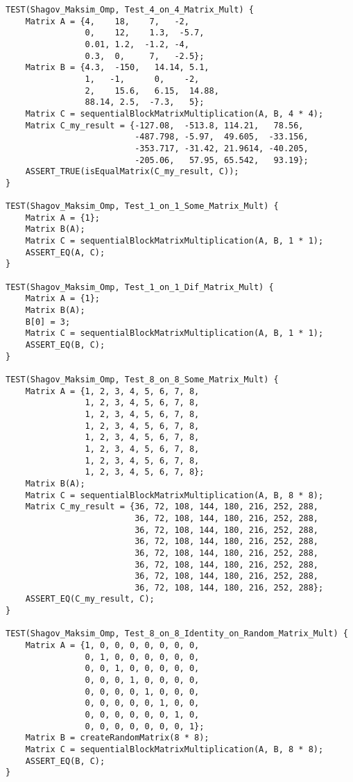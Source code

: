 \documentclass{report}
\begin{document}
\begin{lstlisting}
TEST(Shagov_Maksim_Omp, Test_4_on_4_Matrix_Mult) {
    Matrix A = {4,    18,    7,   -2,
                0,    12,    1.3,  -5.7,
                0.01, 1.2,  -1.2, -4,
                0.3,  0,     7,   -2.5};
    Matrix B = {4.3,  -150,   14.14, 5.1,
                1,   -1,      0,    -2,
                2,    15.6,   6.15,  14.88,
                88.14, 2.5,  -7.3,   5};
    Matrix C = sequentialBlockMatrixMultiplication(A, B, 4 * 4);
    Matrix C_my_result = {-127.08,  -513.8, 114.21,   78.56,
                          -487.798, -5.97,  49.605,  -33.156,
                          -353.717, -31.42, 21.9614, -40.205,
                          -205.06,   57.95, 65.542,   93.19};
    ASSERT_TRUE(isEqualMatrix(C_my_result, C));
}

TEST(Shagov_Maksim_Omp, Test_1_on_1_Some_Matrix_Mult) {
    Matrix A = {1};
    Matrix B(A);
    Matrix C = sequentialBlockMatrixMultiplication(A, B, 1 * 1);
    ASSERT_EQ(A, C);
}

TEST(Shagov_Maksim_Omp, Test_1_on_1_Dif_Matrix_Mult) {
    Matrix A = {1};
    Matrix B(A);
    B[0] = 3;
    Matrix C = sequentialBlockMatrixMultiplication(A, B, 1 * 1);
    ASSERT_EQ(B, C);
}

TEST(Shagov_Maksim_Omp, Test_8_on_8_Some_Matrix_Mult) {
    Matrix A = {1, 2, 3, 4, 5, 6, 7, 8,
                1, 2, 3, 4, 5, 6, 7, 8,
                1, 2, 3, 4, 5, 6, 7, 8,
                1, 2, 3, 4, 5, 6, 7, 8,
                1, 2, 3, 4, 5, 6, 7, 8,
                1, 2, 3, 4, 5, 6, 7, 8,
                1, 2, 3, 4, 5, 6, 7, 8,
                1, 2, 3, 4, 5, 6, 7, 8};
    Matrix B(A);
    Matrix C = sequentialBlockMatrixMultiplication(A, B, 8 * 8);
    Matrix C_my_result = {36, 72, 108, 144, 180, 216, 252, 288,
                          36, 72, 108, 144, 180, 216, 252, 288,
                          36, 72, 108, 144, 180, 216, 252, 288,
                          36, 72, 108, 144, 180, 216, 252, 288,
                          36, 72, 108, 144, 180, 216, 252, 288,
                          36, 72, 108, 144, 180, 216, 252, 288,
                          36, 72, 108, 144, 180, 216, 252, 288,
                          36, 72, 108, 144, 180, 216, 252, 288};
    ASSERT_EQ(C_my_result, C);
}

TEST(Shagov_Maksim_Omp, Test_8_on_8_Identity_on_Random_Matrix_Mult) {
    Matrix A = {1, 0, 0, 0, 0, 0, 0, 0,
                0, 1, 0, 0, 0, 0, 0, 0,
                0, 0, 1, 0, 0, 0, 0, 0,
                0, 0, 0, 1, 0, 0, 0, 0,
                0, 0, 0, 0, 1, 0, 0, 0,
                0, 0, 0, 0, 0, 1, 0, 0,
                0, 0, 0, 0, 0, 0, 1, 0,
                0, 0, 0, 0, 0, 0, 0, 1};
    Matrix B = createRandomMatrix(8 * 8);
    Matrix C = sequentialBlockMatrixMultiplication(A, B, 8 * 8);
    ASSERT_EQ(B, C);
}


\end{lstlisting}
\end{document}
